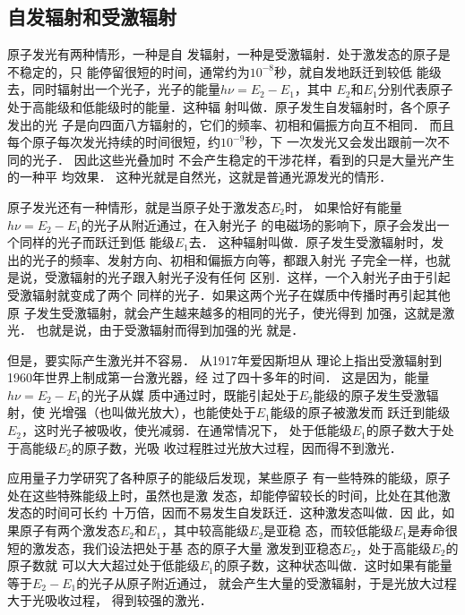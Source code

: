 \subsection{自发辐射和受激辐射}

原子发光有两种情形，一种是自
发辐射，一种是受激辐射．处于激发态的原子是不稳定的，只
能停留很短的时间，通常约为$10^{-8}$秒，就自发地跃迁到较低
能级去，同时辐射出一个光子，光子的能量$h\nu =E_2-E_1$，其中
$E_2$和$E_1$分别代表原子处于高能级和低能级时的能量．这种辐
射叫做．原子发生自发辐射时，各个原子发出的光
子是向四面八方辐射的，它们的频率、初相和偏振方向互不相同．
而且每个原子每次发光持续的时间很短，约$10^{-9}$秒，下
一次发光又会发出跟前一次不同的光子．
因此这些光叠加时
不会产生稳定的干涉花样，看到的只是大量光产生的一种平
均效果．
这种光就是自然光，这就是普通光源发光的情形．

原子发光还有一种情形，就是当原子处于激发态$E_2$时，
如果恰好有能量$h\nu =E_2-E_1$的光子从附近通过，在入射光子
的电磁场的影响下，原子会发出一个同样的光子而跃迁到低
能级$E_1$去．
这种辐射叫做．原子发生受激辐射时，发
出的光子的频率、发射方向、初相和偏振方向等，都跟入射光
子完全一样，也就是说，受激辐射的光子跟入射光子没有任何
区别．这样，一个入射光子由于引起受激辐射就变成了两个
同样的光子．如果这两个光子在媒质中传播时再引起其他原
子发生受激辐射，就会产生越来越多的相同的光子，使光得到
加强，这就是激光．
也就是说，由于受激辐射而得到加强的光
就是．

但是，要实际产生激光并不容易．
从1917年爱因斯坦从
理论上指出受激辐射到1960年世界上制成第一台激光器，经
过了四十多年的时间．
这是因为，能量$h\nu =E_2-E_1$的光子从媒
质中通过时，既能引起处于$E_2$能级的原子发生受激辐射，使
光增强（也叫做光放大），也能使处于$E_1$能级的原子被激发而
跃迁到能级$E_2$，这时光子被吸收，使光减弱．在通常情况下，
处于低能级$E_1$的原子数大于处于高能级$E_2$的原子数，光吸
收过程胜过光放大过程，因而得不到激光．

应用量子力学研究了各种原子的能级后发现，某些原子
有一些特殊的能级，原子处在这些特殊能级上时，虽然也是激
发态，却能停留较长的时间，比处在其他激发态的时间可长约
十万倍，因而不易发生自发跃迁．这种激发态叫做．因
此，如果原子有两个激发态$E_2$和$E_1$，其中较高能级$E_2$是亚稳
态，而较低能级$E_1$是寿命很短的激发态，我们设法把处于基
态的原子大量 激发到亚稳态$E_2$，处于高能级$E_2$的原子数就
可以大大超过处于低能级$E_1$的原子数，这种状态叫做．这时如果有能量等于$E_2-E_1$的光子从原子附近通过，
就会产生大量的受激辐射，于是光放大过程大于光吸收过程，
得到较强的激光．

